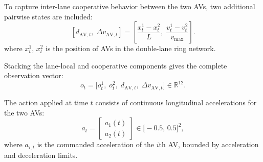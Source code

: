 \documentclass{ifacconf}
\newcommand{\1}{\mbox{1}\hspace{-0.25em}\mbox{l}}
\begin{document}
To capture inter-lane cooperative behavior between the two AVs, two additional pairwise states are included:
\begin{equation}
\left[
d_{\mathrm{AV},t},\;
\Delta v_{\mathrm{AV},t}
\right]
=
\left[
\frac{x_t^1 - x_t^2}{L},\;
\frac{v_t^1 - v_t^2}{v_{\max}}
\right].
\end{equation}
where $x_t^1$, $x_t^2$ is the position of AVs in the double-lane ring network.

Stacking the lane-local and cooperative components gives the complete observation vector:
\begin{equation}
o_t = 
\big[
    o^{1}_t,\;
    o^{2}_t,\;
    d_{\mathrm{AV},t},\;
    \Delta v_{\mathrm{AV},t}
\big]
\in \mathbb{R}^{12}.
\end{equation}


The action applied at time $t$ consists of continuous longitudinal accelerations for the two AVs:
\begin{equation}
a_t
=
\begin{bmatrix}
a_1(t) \\
a_2(t)
\end{bmatrix}
\in 
\big[-0.5,\, 0.5\big]^2,
\end{equation}
where $a_{i,t}$ is the commanded acceleration of the $i$th AV, bounded by acceleration and deceleration limits.





\end{document}
